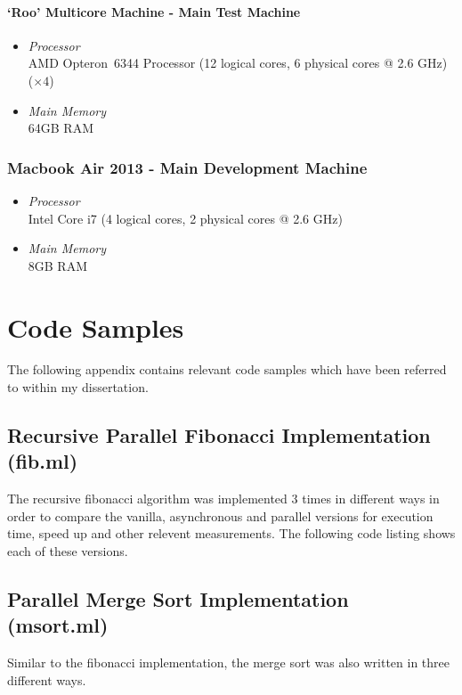 \documentclass[12pt,twoside,notitlepage]{report}
\begin{document}
\subsubsection{`Roo' Multicore Machine - Main Test Machine}
\begin{itemize}
\item {\em Processor} \hfill \\
AMD Opteron\texttrademark\ 6344 Processor (12 logical cores, 6 physical cores @ 2.6 GHz) ($\times4$)
\item {\em Main Memory} \hfill \\
64GB RAM
\end{itemize}

\subsection{Macbook Air 2013 - Main Development Machine}
\begin{itemize}
\item {\em Processor} \hfill \\
Intel Core i7 (4 logical cores, 2 physical cores @ 2.6 GHz)
\item {\em Main Memory} \hfill \\
8GB RAM
\end{itemize}

\chapter{Code Samples}
\label{chap:code_samples}
The following appendix contains relevant code samples which have been referred to within my dissertation.

\section{Recursive Parallel Fibonacci Implementation (fib.ml)}
The recursive fibonacci algorithm was implemented 3 times in different ways in order to compare the vanilla, asynchronous and parallel versions for execution time, speed up and other relevent measurements. The following code listing
shows each of these versions.


\section{Parallel Merge Sort Implementation (msort.ml)}
Similar to the fibonacci implementation, the merge sort was also written in three different ways.

\end{document}
